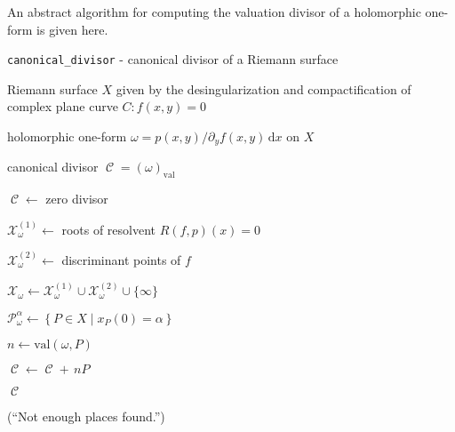\documentclass[12pt]{article}
\theoremstyle{definition}
\newcommand{\dx}{\,\mathrm{d}x}
\DeclareMathOperator{\DivC}{\mathcal{C}}
\begin{document}
An abstract algorithm for computing the valuation divisor of a
holomorphic one-form is given here.
\begin{algorithm}[H]
\caption{{\tt canonical\_divisor} - canonical divisor of a Riemann surface}
\label{alg:canonical}
\begin{algorithmic}[1]
  \Require Riemann surface $X$ given by the desingularization and
  compactification of complex plane curve $C : f(x,y) = 0$

  \Require holomorphic one-form $\omega = p(x,y) / \partial_y f(x,y)
  \dx$ on $X$

  \Ensure canonical divisor $\DivC = (\omega)_\text{val}$

  \State $\DivC \gets$ zero divisor

  \State $\mathcal{X}_\omega^{(1)} \gets$ roots of resolvent $R(f,p)(x)
  = 0$

  \State $\mathcal{X}_\omega^{(2)} \gets$ discriminant points of $f$

  \State $\mathcal{X}_\omega \gets \mathcal{X}_\omega^{(1)} \cup
  \mathcal{X}_\omega^{(2)} \cup \{ \infty \}$


  \State $\mathcal{P}_\omega^\alpha \gets \left\{ P \in X \; | \; x_P(0)
  = \alpha \right\}$


  \State $n \gets \text{val}\left(\omega,P\right)$

  \State $\DivC \gets \DivC + \,n P$

  \If{$\deg \DivC = 2g - 2$}
  \State \Return $\DivC$
  \EndIf

  \EndFor

  \EndFor

  (``Not enough places found.'')

\end{algorithmic}
\end{algorithm}
\end{document}

